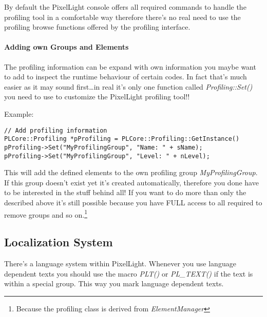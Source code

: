 By default the PixelLight console offers all required commands to handle the profiling tool in a comfortable way therefore there's no real need to use the profiling browse functions offered by the profiling interface.


\paragraph{Adding own Groups and Elements}
The profiling information can be expand with own information you maybe want to add to inspect the runtime behaviour of certain codes. In fact that's much easier as it may sound first\ldots in real it's only one function called \emph{Profiling::Set()} you need to use to customize the PixelLight profiling tool!!

Example:

\begin{lstlisting}[caption=Profiling usage example]
// Add profiling information
PLCore::Profiling *pProfiling = PLCore::Profiling::GetInstance()
pProfiling->Set("MyProfilingGroup", "Name: " + sName);
pProfiling->Set("MyProfilingGroup", "Level: " + nLevel);
\end{lstlisting}

This will add the defined elements to the own profiling group \emph{MyProfilingGroup}. If this group doesn't exist yet it's created automatically, therefore you done have to be interested in the stuff behind all! If you want to do more than only the described above it's still possible because you have FULL access to all required to remove groups and so on.\footnote{Because the profiling class is derived from \emph{ElementManager}}




\subsection{Localization System}
There's a language system within PixelLight. Whenever you use language dependent texts you should use the macro \emph{PLT()} or \emph{PL\_TEXT()} if the text is within a special group. This way you mark language dependent texts.

